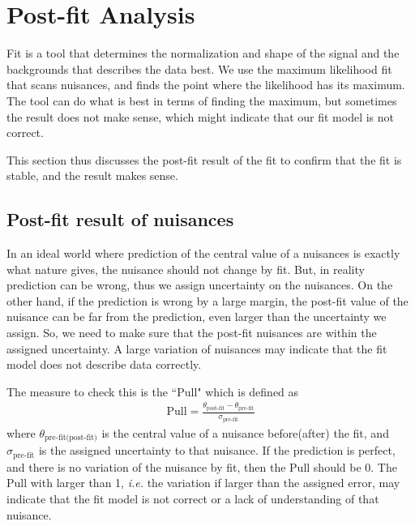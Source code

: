 \section{Post-fit Analysis}

Fit is a tool that determines the normalization and shape of the 
signal and the backgrounds that describes the data best. 
We use the maximum likelihood fit that scans nuisances, and finds 
the point where the likelihood has its maximum. The tool 
can do what is best in terms of finding the maximum, but 
sometimes the result does not make sense, which might 
indicate that our fit model is not correct. 

This section thus discusses the post-fit result of the fit 
to confirm that the fit is stable, and the result makes sense. 

\subsection{Post-fit result of nuisances}

In an ideal world where prediction of the central value of a nuisances is 
exactly what nature gives, the nuisance should not change by fit. But, in reality 
prediction can be wrong, thus we assign uncertainty on the nuisances. On the other 
hand, if the prediction is wrong by a large margin, the post-fit value of the nuisance 
can be far from the prediction, even larger than the uncertainty we assign. 
So, we need to make sure that the post-fit nuisances are within the assigned uncertainty.
A large variation of nuisances may indicate that the fit model does not 
describe data correctly. 

The measure to check this is the ``Pull" which is defined as 
\begin{eqnarray} 
\textrm{Pull} = \frac{\theta_{\textrm{post-fit}} - \theta_{\textrm{pre-fit}}}{\sigma_{\textrm{pre-fit}}}  
\end{eqnarray} 
where $\theta_{\textrm{pre-fit(post-fit)}}$ is the central value of a nuisance 
before(after) the fit, and $\sigma_{\textrm{pre-fit}}$ is the assigned uncertainty 
to that nuisance. If the prediction is perfect, and there is no variation of 
the nuisance by fit, then the Pull should be 0. The Pull with larger than 1, 
\textit{i.e.} the variation if larger than the assigned error, may indicate 
that the fit model is not correct or a lack of understanding of that nuisance. 

